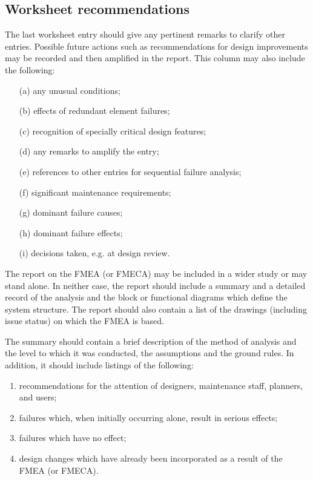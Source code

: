 \documentclass[./dissertation.tex]{subfiles}
\begin{document}
\subsection{Worksheet recommendations}

The last worksheet entry should give any pertinent remarks to clarify other entries. Possible future actions such as recommendations for design improvements may be recorded and then amplified in the report. This column may also include the following:

\begin{enumerate}
\item[(a)] any unusual conditions;
\item[(b)] effects of redundant element failures;
\item[(c)] recognition of specially critical design features;
\item[(d)] any remarks to amplify the entry;
\item[(e)] references to other entries for sequential failure analysis;
\item[(f)] significant maintenance requirements;
\item[(g)] dominant failure causes;
\item[(h)] dominant failure effects;
\item[(i)] decisions taken, e.g. at design review.
\end{enumerate}


The report on the FMEA (or FMECA) may be included in a wider study or may stand alone. In neither case, the report should include a summary and a detailed record of the analysis and the block or functional diagrams which define the system structure. The report should also contain a list of the drawings (including issue status) on which the FMEA is based.

The summary should contain a brief description of the method of analysis and the level to which it was conducted, the assumptions and the ground rules. In addition, it should include listings of the following:

\begin{enumerate}
\item recommendations for the attention of designers, maintenance staff, planners, and users;
\item failures which, when initially occurring alone, result in serious effects;
\item failures which have no effect;
\item design changes which have already been incorporated as a result of the FMEA (or FMECA).
\end{enumerate}
\end{document}
